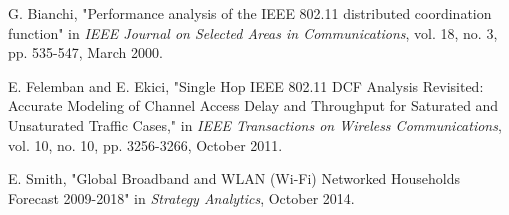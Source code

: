  G. Bianchi, "Performance analysis of the IEEE 802.11 distributed coordination function" in {\it IEEE Journal on Selected Areas in Communications}, vol. 18, no. 3, pp. 535-547, March 2000.

 E. Felemban and E. Ekici, "Single Hop IEEE 802.11 DCF Analysis Revisited: Accurate Modeling of Channel Access Delay and Throughput for Saturated and Unsaturated Traffic Cases," in {\it IEEE Transactions on Wireless Communications}, vol. 10, no. 10, pp. 3256-3266, October 2011.

 E. Smith, "Global Broadband and WLAN (Wi-Fi) Networked Households Forecast 2009-2018" in {\it Strategy Analytics}, October 2014.
